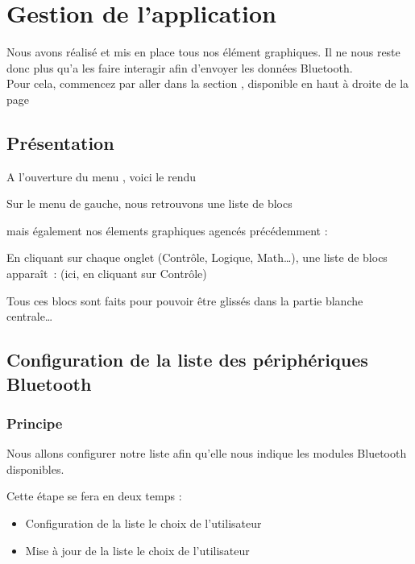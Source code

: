 \chapter{Gestion de l'application}

Nous avons réalisé et mis en place tous nos élément graphiques. Il ne nous reste donc plus qu'a les faire interagir afin d'envoyer les données Bluetooth. \\
\noindent
Pour cela, commencez par aller dans la section , disponible en haut à droite de la page


\newpage
\section{Présentation}
A l'ouverture du menu , voici le rendu

Sur le menu de gauche, nous retrouvons une liste de blocs 

 \label{place_menu_left}

mais également nos élements graphiques agencés précédemment : 


En cliquant sur chaque onglet (Contrôle, Logique, Math…), une liste de blocs apparaît :
(ici, en cliquant sur Contrôle)


Tous ces blocs sont faits pour pouvoir être glissés dans la partie blanche centrale…


\section{Configuration de la liste des périphériques Bluetooth}

\subsection{Principe}

Nous allons configurer notre liste  afin qu'elle nous indique les modules Bluetooth disponibles.

Cette étape se fera en deux temps : 

\begin{itemize}
    \item Configuration de la liste  le choix de l'utilisateur
    \item Mise à jour de la liste  le choix de l'utilisateur
\end{itemize}


